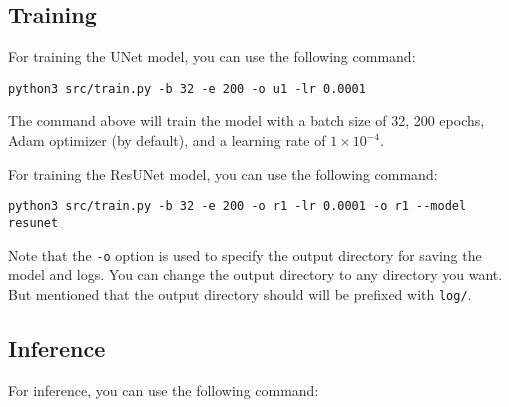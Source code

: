 \subsection{Training}

For training the UNet model, you can use the following command:

\begin{verbatim}
python3 src/train.py -b 32 -e 200 -o u1 -lr 0.0001
\end{verbatim}

The command above will train the model with a batch size of 32, 200 epochs, Adam optimizer (by default), and a learning rate of $1 \times 10^{-4}$.

For training the ResUNet model, you can use the following command:

\begin{verbatim}
python3 src/train.py -b 32 -e 200 -o r1 -lr 0.0001 -o r1 --model resunet
\end{verbatim}

Note that the \texttt{-o} option is used to specify the output directory for saving the model and logs. You can change the output directory to any directory you want.
But mentioned that the output directory should will be prefixed with \texttt{log/}.

\subsection{Inference}

For inference, you can use the following command:

\begin{verbatim}
\end{verbatim}
